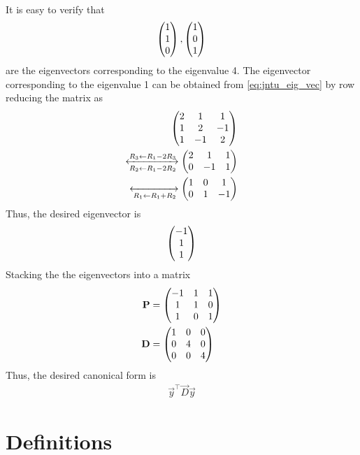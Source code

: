 \documentclass[journal,12pt,twocolumn]{IEEEtran}
\renewcommand\thesection{\arabic{section}}
\begin{document}
\begin{enumerate}[label=\thesection.\arabic*.,ref=\thesection.\theenumi]
\begin{align}
{ }
\end{align}
It is easy to verify that 
\begin{align}
\begin{pmatrix}1 \\ 1 \\ 0 
\end{pmatrix},  
 \begin{pmatrix}1 \\ 0 \\ 1
 \end{pmatrix}
\end{align}
are the eigenvectors corresponding to  the eigenvalue 4.  The eigenvector corresponding to the eigenvalue 1
can be obtained from 
	\eqref{eq:jntu_eig_vec} by row reducing the matrix as 
\begin{align}
\begin{pmatrix}
2 & 1 & 1 
\\ 
1 & 2  & -1
\\
1 & -1 & 2 
\end{pmatrix} 
\\
\xleftrightarrow[R_2 \leftarrow R_1 - 2R_2]{R_3 \leftarrow R_1 - 2R_3}
\begin{pmatrix}
2 & 1 & 1 
\\ 
0 & -1  & 1
\end{pmatrix} 
\\
	\xleftrightarrow[R_1 \leftarrow R_1 + R_2]{}
\begin{pmatrix}
1 & 0 & 1 
\\ 
0 & 1  & -1
\end{pmatrix} 
\end{align}
Thus, the desired eigenvector is 
\begin{align}
\begin{pmatrix}
-1 \\ 1 \\ 1 
\end{pmatrix} 
\end{align}
Stacking the the eigenvectors into a matrix
\begin{align}
	\mathbf{P} &= 
\begin{pmatrix}
-1 & 1 & 1 
\\
1 & 1 & 0 
\\
1 & 0 & 1
	\end{pmatrix}
	\\
	\mathbf{D} &= 
\begin{pmatrix}
1 & 0 & 0 
\\
0 & 4 & 0 
\\
	0 & 0 & 4\end{pmatrix}
\end{align}
Thus, the desired canonical form is 
\begin{align}
	\vec{y}^{\top}
	\vec{D}
	\vec{y}
\end{align}
\end{enumerate}
\section{Definitions}
\end{document}
